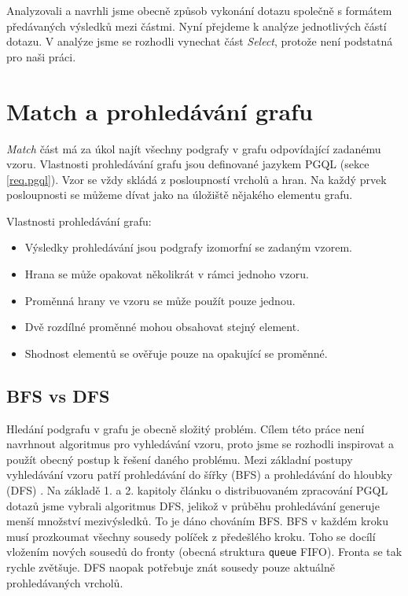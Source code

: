 Analyzovali a navrhli jsme obecně způsob vykonání dotazu společně s formátem předávaných výsledků mezi částmi. 
Nyní přejdeme k analýze jednotlivých částí dotazu. 
V analýze jsme se rozhodli vynechat část \textit{Select}, protože není podstatná pro naši práci.

\section{Match a prohledávání grafu} \label{anal.match}

\textit{Match} část má za úkol najít všechny podgrafy v grafu odpovídající zadanému vzoru.
Vlastnosti prohledávání grafu jsou definované jazykem PGQL (sekce \ref{req.pgql}).
Vzor se vždy skládá z posloupností vrcholů a hran.
Na každý prvek posloupnosti se můžeme dívat jako na úložiště nějakého elementu grafu.

Vlastnosti prohledávání grafu:
\begin{itemize}

\item Výsledky prohledávání jsou podgrafy izomorfní se zadaným vzorem.
\item Hrana se může opakovat několikrát v rámci jednoho vzoru.
\item Proměnná hrany ve vzoru se může použít pouze jednou.
\item Dvě rozdílné proměnné mohou obsahovat stejný element.
\item Shodnost elementů se ověřuje pouze na opakující se proměnné.

\end{itemize}

\subsection{BFS vs DFS}

Hledání podgrafu v grafu je obecně složitý problém. 
Cílem této práce není navrhnout algoritmus pro vyhledávání vzoru, proto jsme se rozhodli inspirovat a použít obecný postup k řešení daného problému.
Mezi základní postupy vyhledávání vzoru patří prohledávání do šířky (BFS) a prohledávání do hloubky (DFS) \citep[kap. 4]{graphAlg}. 
Na základě 1. a 2. kapitoly článku o distribuovaném zpracování PGQL dotazů \citep{asyncPGX} jsme vybrali algoritmus DFS, jelikož v průběhu prohledávání generuje menší množství mezivýsledků.
To je dáno chováním BFS.
BFS v každém kroku musí prozkoumat všechny sousedy políček z předešlého kroku.
Toho se docílí vložením nových sousedů do fronty (obecná struktura \texttt{queue} FIFO).
Fronta se tak rychle zvětšuje.
DFS naopak potřebuje znát sousedy pouze aktuálně prohledávaných vrcholů.

